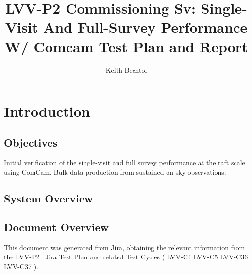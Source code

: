 \documentclass[DM,lsstdraft,STR,toc]{lsstdoc}
\begin{document}
\def\milestoneName{Commissioning Sv: Single-Visit And Full-Survey Performance W/ Comcam}
\def\milestoneId{LVV-P2}
\def\product{Commissioning Science Verification}


\title{ LVV-P2 Commissioning Sv: Single-Visit And Full-Survey Performance W/ Comcam Test Plan and Report}
\setDocRef{\lsstDocType-\lsstDocNum}
\date{\vcsdate}
\author{ Keith Bechtol }






\maketitle

\section{Introduction}
\label{sect:intro}


\subsection{Objectives}
\label{sect:objectives}

Initial verification of the single-visit and full survey performance at
the raft scale using ComCam. Bulk data production from sustained on-sky
observations.



\subsection{System Overview}
\label{sect:systemoverview}



\subsection{Document Overview}
\label{sect:docoverview}

This document was generated from Jira, obtaining the relevant information from the 
\href{https://jira.lsstcorp.org/secure/Tests.jspa#/testPlan/LVV-P2}{LVV-P2}
~Jira Test Plan and related Test Cycles (
  \href{https://jira.lsstcorp.org/secure/Tests.jspa#/testCycle/LVV-C4}{LVV-C4}
  \href{https://jira.lsstcorp.org/secure/Tests.jspa#/testCycle/LVV-C5}{LVV-C5}
  \href{https://jira.lsstcorp.org/secure/Tests.jspa#/testCycle/LVV-C36}{LVV-C36}
  \href{https://jira.lsstcorp.org/secure/Tests.jspa#/testCycle/LVV-C37}{LVV-C37}
).
\end{document}
